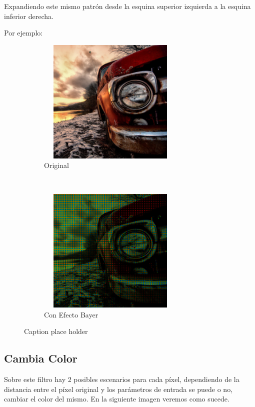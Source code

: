 Expandiendo este mismo patrón desde la esquina superior izquierda a la esquina inferior derecha. 

Por ejemplo:

\begin{figure}[H]
    \centering
    \begin{subfigure}[H]{0.5\textwidth}
        \centering
        \includegraphics[width=7cm, height=6cm]{images/car.png}
        \caption{Original}
    \end{subfigure}%
    ~ 
    \begin{subfigure}[H]{0.5\textwidth}
        \centering
        \includegraphics[width=7cm, height=6cm]{images/img_efectoBayer.png}
        \caption{Con Efecto Bayer}
    \end{subfigure}
    \caption{Caption place holder}
\end{figure} 

\subsection{Cambia Color}

Sobre este filtro hay 2 posibles escenarios para cada píxel, dependiendo de la distancia entre el píxel original y los parámetros de entrada se puede o no, cambiar el color del mismo. En la siguiente imagen veremos como sucede.

